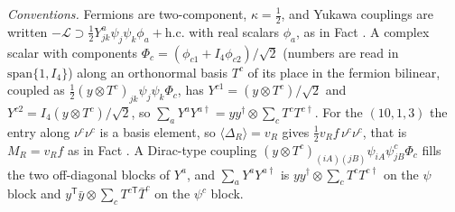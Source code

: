 \emph{Conventions.} Fermions are two-component, $\kappa = \tfrac12$, and Yukawa couplings are written $-\mathcal{L} \supset \tfrac12 Y^{a}_{jk}\psi_{j}\psi_{k}\phi_{a} + \mathrm{h.c.}$ with real scalars $\phi_{a}$, as in Fact . A complex scalar with components $\Phi_{c} = (\phi_{c1} + I_{4}\phi_{c2})/\sqrt{2}$ (numbers are read in $\mathrm{span}\{1, I_{4}\}$) along an orthonormal basis $T^{c}$ of its place in the fermion bilinear, coupled as $\tfrac12(y\otimes T^{c})_{jk}\psi_{j}\psi_{k}\Phi_{c}$, has $Y^{c1} = (y\otimes T^{c})/\sqrt2$ and $Y^{c2} = I_{4}(y\otimes T^{c})/\sqrt2$, so $\sum_{a}Y^{a}Y^{a\dagger} = yy^{\dagger}\otimes\sum_{c}T^{c}T^{c\dagger}$. For the $(10,1,3)$ the entry along $\nu^{c}\nu^{c}$ is a basis element, so $\langle\Delta_{R}\rangle = v_{R}$ gives $\tfrac12 v_{R}f\,\nu^{c}\nu^{c}$, that is $M_{R} = v_{R}f$ as in Fact . A Dirac-type coupling $(y\otimes T^{c})_{(iA)(jB)}\psi_{iA}\psi^{c}_{jB}\Phi_{c}$ fills the two off-diagonal blocks of $Y^{a}$, and $\sum_{a}Y^{a}Y^{a\dagger}$ is $yy^{\dagger}\otimes\sum_{c}T^{c}T^{c\dagger}$ on the $\psi$ block and $y^{\mathsf T}\bar{y}\otimes\sum_{c}T^{c\mathsf{T}}\bar{T}^{c}$ on the $\psi^{c}$ block.

